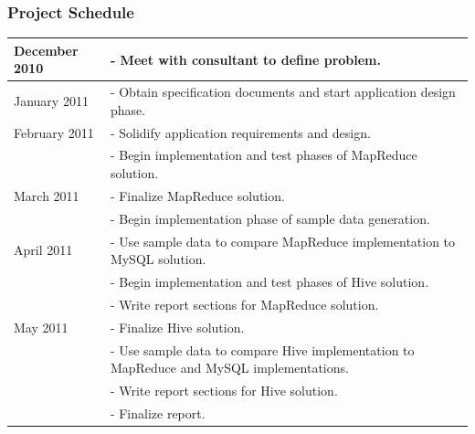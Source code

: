 \documentclass[hyperref={pdfpagelabels=false}]{beamer}
\begin{document}
\begin{frame}[fragile,shrink=12]
\begin{center}
\frametitle{Project Schedule}

\begin{tabular}{ | l || p{3.5in} | }\hline
 December 2010 & - Meet with consultant to define problem.\\\hline
  January 2011 & - Obtain specification documents and start application design
     phase.\\\hline
 February 2011 & - Solidify application requirements and design.\\
        \hfill & - Begin implementation and test phases of MapReduce
                 solution.\\\hline
    March 2011 & - Finalize MapReduce solution.\\
        \hfill & - Begin implementation phase of sample data generation.\\\hline
    April 2011 & - Use sample data to compare MapReduce implementation to MySQL
                 solution.\\
        \hfill & - Begin implementation and test phases of Hive solution.\\
        \hfill &-  Write report sections for MapReduce solution.\\\hline
      May 2011 & - Finalize Hive solution.\\
        \hfill & - Use sample data to compare Hive implementation to MapReduce  
                 and MySQL implementations.\\
        \hfill & - Write report sections for Hive solution.\\
        \hfill & - Finalize report.\\\hline
\end{tabular}

\end{center}
\end{frame}
\end{document}
